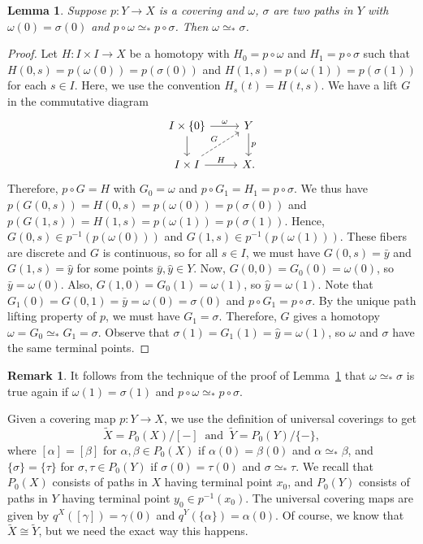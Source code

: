 \documentclass[10pt,a4paper]{amsart}
\newtheorem{lemma}{Lemma}
\theoremstyle{definition}
\newtheorem{remark}{Remark}
\begin{document}
\begin{lemma}\label{lem:lifthomo}
Suppose $p \colon Y \to X$ is a covering and $\omega$, $\sigma$ are two paths in $Y$ with $\omega(0)
= \sigma(0)$ and $p\circ \omega \simeq_* p \circ \sigma$. Then $\omega \simeq_* \sigma$.
\end{lemma}
\begin{proof}
Let $H\colon I \times I\to X$ be a homotopy with $H_0=p\circ \omega$ and $H_1 = p\circ \sigma$ such that
$H(0,s)= p(\omega(0)) = p(\sigma(0))$ and $H(1,s) = p(\omega(1)) = p(\sigma(1))$ for each $s\in I$. Here, we use the convention $H_s(t)=H(t,s)$. We have a lift
$G$ in the commutative diagram
\[
\begin{tikzcd}[contains/.style = {draw=none,"\in" description,sloped}]
I \times \{0\} \arrow{r}{\omega} \arrow[swap]{d}
&
Y \arrow{d}{p}
\\
I\times I  \arrow{r}{H} \arrow[ur, dashed, "G"]
&
X.
\end{tikzcd}
\]
Therefore, $p\circ G=H$ with $G_0=\omega$ and $p\circ G_1=H_1=p\circ \sigma$. We thus have $p(G(0,s))=H(0,s)=p(\omega(0))
=p(\sigma(0))$ and $p(G(1,s))=H(1,s)=p(\omega(1))=p(\sigma(1))$. Hence, $G(0,s) \in p^{-1}(p(\omega(0)))$
and $G(1,s) \in p^{-1}(p(\omega(1)))$. These fibers are discrete and $G$ is continuous, so for all $s\in I$, we must have
$G(0,s)=\bar y$ and $G(1,s)=\widehat y$ for some points $\bar y,\widehat y\in Y$. Now, $G(0,0)=G_0(0)=\omega(0)$, so $\bar y=\omega(0)$. Also, $G(1,0)=G_0(1)=\omega(1)$, so $\widehat y=\omega (1)$. Note that $G_1(0)=G(0,1)=\bar y=\omega(0)=\sigma(0)$ and $p\circ G_1=p\circ \sigma$. By the unique path lifting property of $p$, we must have $G_1 = \sigma$. Therefore, $G$ gives
a homotopy $\omega =G_0\simeq_* G_1 = \sigma$. Observe that $\sigma(1)=G_1(1)=\widehat y=\omega(1)$, so $\omega$ and $\sigma$ have the same terminal points.
\end{proof}

\begin{remark}\label{rem:lifthomo2}
    It follows from the technique of the proof of Lemma~\ref{lem:lifthomo} that $\omega\simeq_{*}\sigma$ is true again if $\omega(1)=\sigma(1)$ and $p\circ \omega\simeq_{*}p\circ\sigma$.
\end{remark}

Given a covering map $p:Y\to X$, we use the definition of universal coverings to get
\[
\widetilde X = P_0(X)/[-]\ \text{ and }\ \widetilde Y = P_0(Y)/\{-\},
\]
where $[\alpha]=[\beta]$ for $\alpha,\beta\in P_0(X)$ if $\alpha(0)=\beta(0)$ and $\alpha\simeq_* \beta$, and $\{\sigma\}
=\{\tau\}$ for $\sigma,\tau \in P_0(Y)$ if $\sigma(0)=\tau(0)$ and $\sigma\simeq_* \tau$. We recall that $P_0(X)$ consists of paths in $X$ having terminal point $x_0$, and $P_0(Y)$ consists of paths in $Y$ having terminal point $y_0\in p^{-1}(x_0)$. The universal covering maps are given by $q^X([\gamma])=\gamma(0)$ and $q^Y(\{\alpha\})=\alpha(0)$. Of course, we know that $\widetilde X \cong \widetilde Y$, but we need the exact way this happens.
\end{document}
